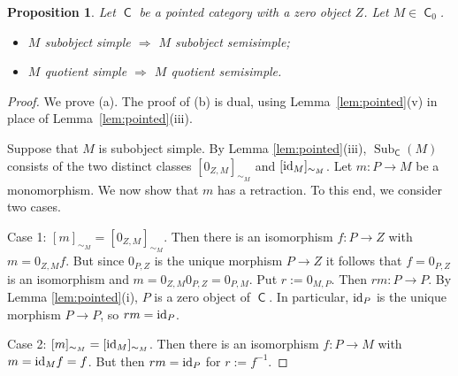 \documentclass[12pt]{amsart}
\newtheorem{prop}[thm]{Proposition}
\theoremstyle{definition}
\newcommand{\id}{{\rm id}}
\DeclareMathOperator{\C}{\mathsf C}
\DeclareMathOperator{\Sub}{Sub}
\begin{document}
\begin{prop}\label{prop:simpleimpliessemisimple}
Let $\C$ be a pointed category
with a zero object $Z$.
Let $M \in \C_0$.
\begin{itemize}[widest=(a)]

\item[{\rm (a)}] $M$ subobject simple
$\Longrightarrow$ $M$ subobject semisimple;

\item[{\rm (b)}] $M$ quotient simple
$\Longrightarrow$ $M$ quotient semisimple.

\end{itemize}
\end{prop}

\begin{proof}
We prove (a). The proof of (b) is dual, using Lemma~\ref{lem:pointed}\textup{(v)} in place of Lemma~\ref{lem:pointed}\textup{(iii)}.

Suppose that $M$ is subobject simple.
By Lemma \ref{lem:pointed}(iii), 
$\Sub_{\C}(M)$ consists of the two distinct
classes $[0_{Z,M}]_{\sim_M}$ and
$[\id_M]_{\sim_M}$.
Let $m : P \to M$ be a monomorphism.
We now show that $m$ has a retraction.
To this end, we consider two cases.

Case 1: $[m]_{\sim_M} = [0_{Z,M}]_{\sim_M}$.
Then there is an isomorphism
$f : P \to Z$ with $m = 0_{Z,M} f$. 
But since $0_{P,Z}$ is the unique
morphism $P \to Z$ it follows that $f=0_{P,Z}$
is an isomorphism and 
$m = 0_{Z,M} 0_{P,Z} = 0_{P,M}$.
Put $r := 0_{M,P}$. Then $rm : P \to P$.
By Lemma \ref{lem:pointed}(i),
$P$ is a zero object of $\C$. 
In particular, 
$\id_P$ is the unique morphism $P \to P$,
so $rm = \id_P$.

Case 2: $[m]_{\sim_M} = [\id_M]_{\sim_M}$.
Then there is an isomorphism
$f : P \to M$ with $m = \id_M f = f$.
But then $rm = \id_P$ for $r:= f^{-1}$. 
\end{proof}
\end{document}
